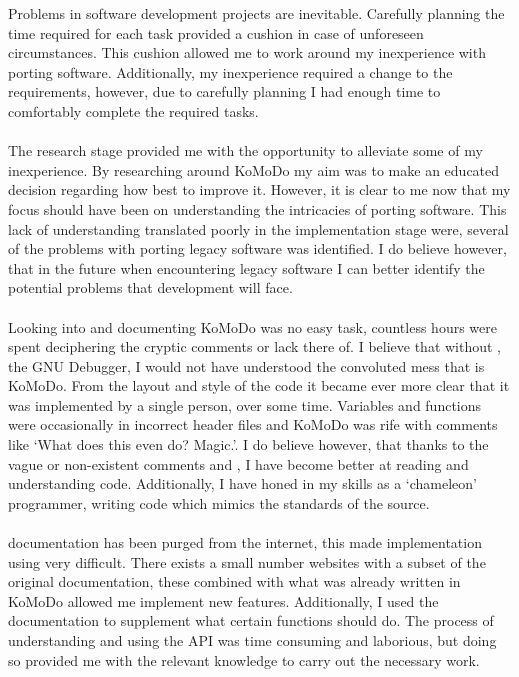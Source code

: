 Problems in software development projects are inevitable. Carefully planning the time required for each task provided a cushion in case of unforeseen circumstances. This cushion allowed me to work around my inexperience with porting software. Additionally, my inexperience required a change to the requirements, however, due to carefully planning I had enough time to comfortably complete the required tasks.\\\\
%
The research stage provided me with the opportunity to alleviate some of my inexperience. By researching around KoMoDo my aim was to make an educated decision regarding how best to improve it. However, it is clear to me now that my focus should have been on understanding the intricacies of porting software. This lack of understanding translated poorly in the implementation stage were, several of the problems with porting legacy software was identified. I do believe however, that in the future when encountering legacy software I can better identify the potential problems that development will face.\\\\
%
Looking into and documenting KoMoDo was no easy task, countless hours were spent deciphering the cryptic comments or lack there of. I believe that without , the GNU Debugger, I would not have understood the convoluted mess that is KoMoDo. From the layout and style of the code it became ever more clear that it was implemented by a single person, over some time. Variables and functions were occasionally in incorrect header files and KoMoDo was rife with comments like `What does this even do? Magic.'. I do believe however, that thanks to the vague or non-existent comments and , I have become better at reading and understanding code. Additionally, I have honed in my skills as a `chameleon' programmer, writing code which mimics the standards of the source.\\\\
%
 documentation has been purged from the internet, this made implementation using  very difficult. There exists a small number websites with a subset of the original documentation, these combined with what was already written in KoMoDo allowed me implement new features. Additionally, I used the  documentation to supplement what certain functions should do. The process of understanding and using the  API was time consuming and laborious, but doing so provided me with the relevant knowledge to carry out the necessary work.\\\\

